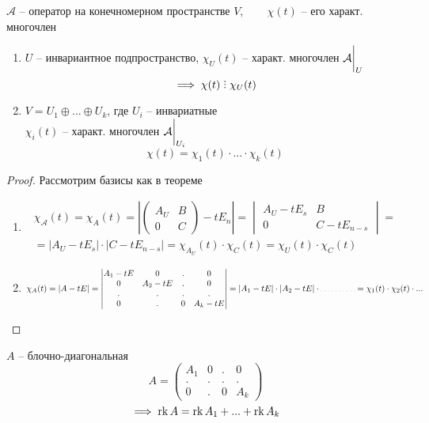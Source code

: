 \begin{implication}
	$ \mathcal{A} $ -- оператор на конечномерном пространстве $ V, \qquad \chi(t) $ -- его характ. многочлен
	\begin{enumerate}
		\item $ U $ -- инвариантное подпространство, $ \chi_U(t) $ -- характ. многочлен $ \mathcal{A}\bigg|_{U}^{} $
		$$ \implies \chi(t) \divby \chi_U(t) $$
		\item $ V = U_1 \oplus ... \oplus U_k $, где $ U_i $ -- инвариатные \\
		$ \chi_i(t) $ -- характ. многочлен $ \mathcal{A}\bigg|_{U_i}^{} $
		$$ \chi(t) = \chi_1(t) \cdot ... \cdot \chi_k(t) $$
	\end{enumerate}
\end{implication}

\begin{proof}
	Рассмотрим базисы как в теореме
	\begin{enumerate}
		\item
		\begin{multline*}
			\chi_{\mathcal{A}}(t) = \chi_A(t) = \left|
			\begin{pmatrix}
				A_U & B \\
				0 & C
			\end{pmatrix} - t E_n \right| =
			\begin{vmatrix}
				A_U - t E_s & B \\
				0 & C - t E_{n - s}
			\end{vmatrix} = \\
			= |A_U - t E_s | \cdot | C - t E_{n -s} | = \chi_{A_U}(t) \cdot \chi_C(t) = \chi_U(t) \cdot \chi_C(t)
		\end{multline*}
		\item
		$$ \chi_A(t) = |A - tE| =
		\begin{vmatrix}
			A_1 - tE & 0 & . & 0 \\
			0 & A_2 - tE & . & 0 \\
			. & . & . & . \\
			0 & . & 0 & A_k - tE
		\end{vmatrix} = |A_1 - tE| \cdot |A_2 - tE| \cdot \widedots[4em] = \chi_1(t) \cdot \chi_2(t) \cdot ... $$
	\end{enumerate}
\end{proof}

\begin{lemma}
	$ A $ -- блочно-диагональная
	$$ A =
	\begin{pmatrix}
		A_1 & 0 & . & 0 \\
		. & . & . & . \\
		0 & . & 0 & A_k
	\end{pmatrix} $$
	$$ \implies \operatorname{rk} A = \operatorname{rk} A_1 + ... + \operatorname{rk} A_k $$
\end{lemma}

